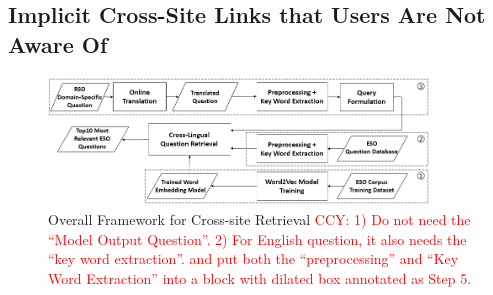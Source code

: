 \subsection{Implicit Cross-Site Links that Users Are Not Aware Of}

\begin{figure}
	\centering
	\includegraphics[width = 0.9\textwidth]{figures/workflow.png}
	\caption{Overall Framework for Cross-site Retrieval \textcolor{red}{CCY: 1) Do not need the ``Model Output Question''. 2) For English question, it also needs the ``key word extraction''. and put both the ``preprocessing'' and ``Key Word Extraction'' into a block with dilated box annotated as Step 5.}}
	\centering
	\label{fig:flowChart}
\end{figure}


